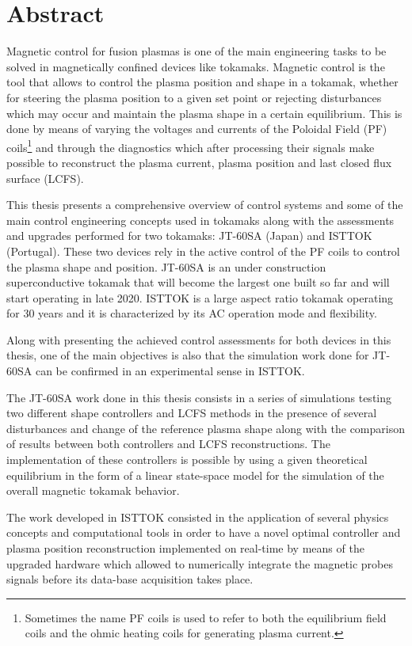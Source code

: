 \chapter*{Abstract}
Magnetic control for fusion plasmas is one of the main engineering tasks to be solved in magnetically  confined devices like tokamaks. Magnetic control is the tool that allows to control the plasma position and shape in a tokamak, whether  for steering the plasma position to a given set point or rejecting disturbances which may occur and maintain the plasma shape in a certain equilibrium. This is done by means of varying the voltages and currents of the  Poloidal Field (PF) coils\footnote{Sometimes the name PF coils is used to refer to  both the equilibrium field coils and the ohmic heating coils for generating plasma current.} and through the diagnostics which after processing their signals make possible to reconstruct the plasma current, plasma position and last closed flux surface (LCFS).
\smallskip

This thesis presents a comprehensive overview of control systems and some of the main control engineering concepts used in tokamaks along with  the assessments and upgrades performed for two tokamaks: JT-60SA (Japan) and ISTTOK (Portugal). These two devices rely in the active control of the PF coils to control the plasma shape and position. JT-60SA is an under construction superconductive tokamak that will become the largest one built so far and will start operating in late 2020. ISTTOK is a large aspect ratio tokamak operating for 30 years and it is characterized by its AC operation mode and flexibility. \smallskip

 Along with presenting the achieved control assessments for both devices in this thesis, one of the main objectives  is also that the simulation work done for JT-60SA can be confirmed in an experimental sense in ISTTOK. \smallskip
 
The JT-60SA work done in this thesis consists in a series of simulations testing two different shape controllers and LCFS methods in the presence of several disturbances and change of the reference plasma shape along with the comparison of results between both controllers and LCFS reconstructions. The implementation of these controllers is possible by using a given theoretical equilibrium in the form of a linear state-space model for the simulation of the overall magnetic  tokamak behavior.\smallskip

 The work developed in ISTTOK consisted in the application of several physics concepts and computational tools in order to have a novel optimal controller and plasma position reconstruction implemented on real-time by means of the upgraded hardware which allowed to numerically integrate the magnetic probes signals before its data-base acquisition takes place. \smallskip
 

